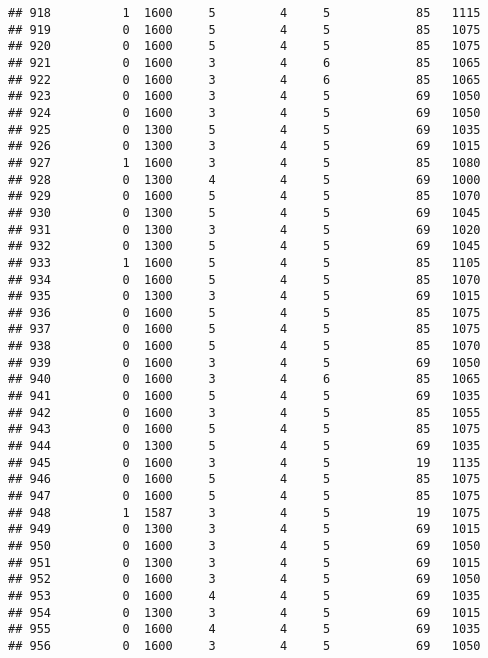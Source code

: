 \documentclass[]{article}
\begin{document}
\begin{verbatim}
## 918          1  1600     5         4     5            85   1115
## 919          0  1600     5         4     5            85   1075
## 920          0  1600     5         4     5            85   1075
## 921          0  1600     3         4     6            85   1065
## 922          0  1600     3         4     6            85   1065
## 923          0  1600     3         4     5            69   1050
## 924          0  1600     3         4     5            69   1050
## 925          0  1300     5         4     5            69   1035
## 926          0  1300     3         4     5            69   1015
## 927          1  1600     3         4     5            85   1080
## 928          0  1300     4         4     5            69   1000
## 929          0  1600     5         4     5            85   1070
## 930          0  1300     5         4     5            69   1045
## 931          0  1300     3         4     5            69   1020
## 932          0  1300     5         4     5            69   1045
## 933          1  1600     5         4     5            85   1105
## 934          0  1600     5         4     5            85   1070
## 935          0  1300     3         4     5            69   1015
## 936          0  1600     5         4     5            85   1075
## 937          0  1600     5         4     5            85   1075
## 938          0  1600     5         4     5            85   1070
## 939          0  1600     3         4     5            69   1050
## 940          0  1600     3         4     6            85   1065
## 941          0  1600     5         4     5            69   1035
## 942          0  1600     3         4     5            85   1055
## 943          0  1600     5         4     5            85   1075
## 944          0  1300     5         4     5            69   1035
## 945          0  1600     3         4     5            19   1135
## 946          0  1600     5         4     5            85   1075
## 947          0  1600     5         4     5            85   1075
## 948          1  1587     3         4     5            19   1075
## 949          0  1300     3         4     5            69   1015
## 950          0  1600     3         4     5            69   1050
## 951          0  1300     3         4     5            69   1015
## 952          0  1600     3         4     5            69   1050
## 953          0  1600     4         4     5            69   1035
## 954          0  1300     3         4     5            69   1015
## 955          0  1600     4         4     5            69   1035
## 956          0  1600     3         4     5            69   1050

\end{verbatim}
\end{document}
